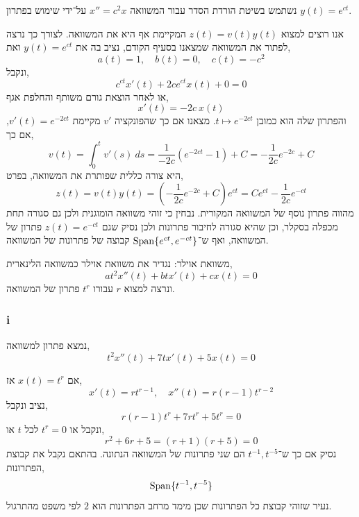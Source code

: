 \subquestion{}
נשתמש בשיטת הורדת הסדר עבור המשוואה $x'' = c^2 x$ על־ידי שימוש בפתרון $y(t) = e^{c t}$.
\begin{solution}
	אנו רוצים למצוא $z(t) = v(t) y(t)$ המקיימת אף היא את המשוואה.
	לצורך כך נרצה לפתור את המשוואה שמצאנו בסעיף הקודם, נציב בה את $y(t) = e^{c t}$ ואת,
	\[
		a(t) = 1,
		\quad
		b(t) = 0,
		\quad
		c(t) = -c^2
	\]
	ונקבל,
	\[
		c^{c t} x'(t) + 2 c e^{c t} x(t) + 0 = 0
	\]
	או לאחר הוצאת גורם משותף והחלפת אגף,
	\[
		x'(t) = -2c\ x(t)
	\]
	והפתרון שלה הוא כמובן $t \mapsto e^{-2c t}$.
	מצאנו אם כך שהפונקציה $v'$ מקיימת $v'(t) = e^{-2c t}$, אם כך,
	\[
		v(t)
		= \int_0^t v'(s)\ ds
		= \frac{1}{-2c} (e^{-2c t} - 1) + C
		= -\frac{1}{2c} e^{-2c} + C
	\]
	היא צורה כללית שפותרת את המשוואה, בפרט,
	\[
		z(t)
		= v(t) y(t)
		= (-\frac{1}{2c} e^{-2c} + C) e^{c t}
		= C e^{c t} - \frac{1}{2 c} e^{-c t}
	\]
	מהווה פתרון נוסף של המשוואה המקורית.
	נבחין כי זוהי משוואה הומוגנית ולכן גם סגורה תחת מכפלה בסקלר, וכן שהיא סגורה לחיבור פתרונות ולכן נסיק שגם $z(t) = e^{-ct}$ פתרון של המשוואה, ואף ש־$\operatorname{Span}\{ e^{c t}, e^{-c t} \}$ קבוצה של פתרונות של המשוואה.
\end{solution}

\subquestion{}
משוואת אוילר:
נגדיר את משוואת אוילר כמשוואה הלינארית,
\[
	a t^2 x''(t) + b t x'(t) + c x(t) = 0
\]
ונרצה למצוא $r$ עבורו $t^r$ פתרון של המשוואה.

\subsubsection{i}
נמצא פתרון למשוואה,
\[
	t^2 x''(t) + 7 t x'(t) + 5 x(t) = 0
\]
\begin{solution}
	אם $x(t) = t^r$ אז,
	\[
		x'(t)
		= r t^{r - 1},
		\quad
		x''(t)
		= r(r - 1) t^{r - 2}
	\]
	נציב ונקבל,
	\[
		r (r - 1) t^r + 7 r t^r + 5 t^r = 0
	\]
	ונקבל או $t^r = 0$ לכל $t$ או,
	\[
		r^2 + 6r + 5
		= (r + 1) (r + 5)
		= 0
	\]
	נסיק אם כך ש־$t^{-1}, t^{-5}$ הם שני פתרונות של המשוואה הנתונה.
	בהתאם נקבל את קבוצת הפתרונות,
	\[
		\operatorname{Span}\{ t^{-1}, t^{-5} \}
	\]
	נעיר שזוהי קבוצת כל הפתרונות שכן מימד מרחב הפתרונות הוא $2$ לפי משפט מהתרגול.
\end{solution}

